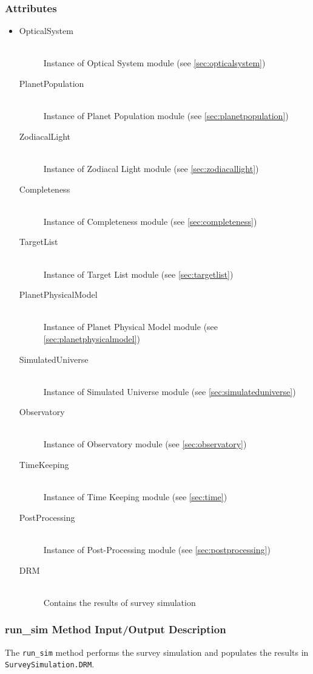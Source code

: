 \documentclass[cleanfoot]{asme2ej}
\begin{document}
\subsubsection*{Attributes}
\begin{itemize}
    \item
    \begin{description}
        \item[OpticalSystem] \hfill \\
        Instance of Optical System module (see \ref{sec:opticalsystem})
        \item[PlanetPopulation] \hfill \\
        Instance of Planet Population module (see \ref{sec:planetpopulation})
        \item[ZodiacalLight] \hfill \\
        Instance of Zodiacal Light module (see \ref{sec:zodiacallight})
        \item[Completeness] \hfill \\
        Instance of Completeness module (see \ref{sec:completeness})
        \item[TargetList] \hfill \\
        Instance of Target List module (see \ref{sec:targetlist})
        \item[PlanetPhysicalModel] \hfill \\
        Instance of Planet Physical Model module (see \ref{sec:planetphysicalmodel})
        \item[SimulatedUniverse] \hfill \\
        Instance of Simulated Universe module (see \ref{sec:simulateduniverse})
        \item[Observatory] \hfill \\
        Instance of Observatory module (see \ref{sec:observatory})
        \item[TimeKeeping] \hfill \\
        Instance of Time Keeping module (see \ref{sec:time})
        \item[PostProcessing] \hfill \\
        Instance of Post-Processing module (see \ref{sec:postprocessing})
        \item[DRM] \hfill \\
        Contains the results of survey simulation
    \end{description}
\end{itemize}

\subsubsection{run\_sim Method Input/Output Description} \label{sec:runsimtask}
The \verb+run_sim+ method performs the survey simulation and populates the results in \verb+SurveySimulation.DRM+.
\end{document}
